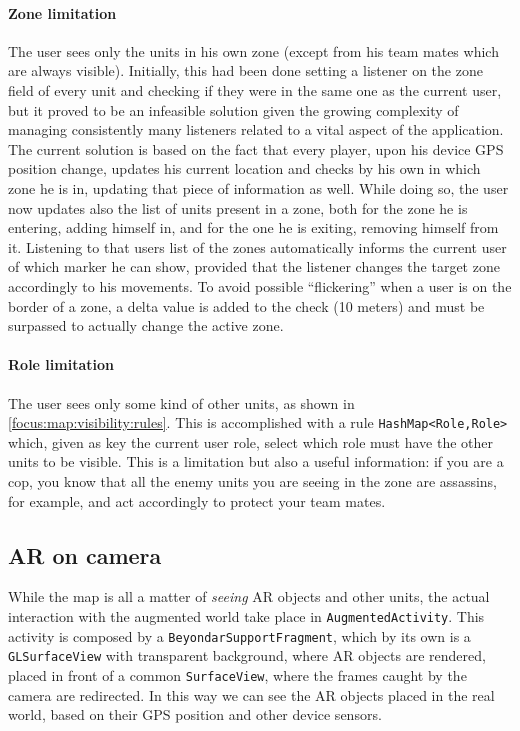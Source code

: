 				\paragraph{Zone limitation}
				
				The user sees only the units in his own zone (except from his team mates which are always visible). Initially, this had been done setting a listener on the zone field of every unit and checking if they were in the same one as the current user, but it proved to be an infeasible solution given the growing complexity of managing consistently many listeners related to a vital aspect of the application.
				The current solution is based on the fact that every player, upon his device GPS position change, updates his current location and checks by his own in which zone he is in, updating that piece of information as well.
				While doing so, the user now updates also the list of units present in a zone, both for the zone he is entering, adding himself in, and for the one he is exiting, removing himself from it.
				Listening to that users list of the zones automatically informs the current user of which marker he can show, provided that the listener changes the target zone accordingly to his movements.
				To avoid possible “flickering” when a user is on the border of a zone, a delta value is added to the check (10 meters) and must be surpassed to actually change the active zone.
				
				\paragraph{Role limitation}
				
				The user sees only some kind of other units, as shown in \autoref{focus:map:visibility:rules}.
				This is accomplished with a rule \lstinline|HashMap<Role,Role>| which, given as key the current user role, select which role must have the other units to be visible.
				This is a limitation but also a useful information: if you are a cop, you know that all the enemy units you are seeing in the zone are assassins, for example, and act accordingly to protect your team mates.
				
		\subsection{AR on camera}\label{focus:augmented}
			
		While the map is all a matter of \emph{seeing} AR objects and other units, the actual interaction with the augmented world take place in \lstinline|AugmentedActivity|.
		This activity is composed by a \lstinline|BeyondarSupportFragment|, which by its own is a \lstinline|GLSurfaceView| with transparent background, where AR objects are rendered, placed in front of a common \lstinline|SurfaceView|, where the frames caught by the camera are redirected. In this way we can see the AR objects placed in the real world, based on their GPS position and other device sensors.
		
